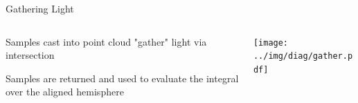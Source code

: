 \documentclass[10pt,compress,professionalfont]{beamer}
\begin{document}
\begin{frame}{Gathering Light}

    \begin{columns}
        \begin{column}{0.5\textwidth}

    \vspace{-5mm}
    Samples cast into point cloud "gather" light via intersection\\
    \vspace{8mm}

    Samples are returned and used to evaluate the integral over the aligned hemisphere

        \end{column}
        \begin{column}{0.5\textwidth}
            \texttt{[image: ../img/diag/gather.pdf]}\\
            \vspace{-4mm}
        \end{column}
    \end{columns}
    

\end{frame}
\end{document}
